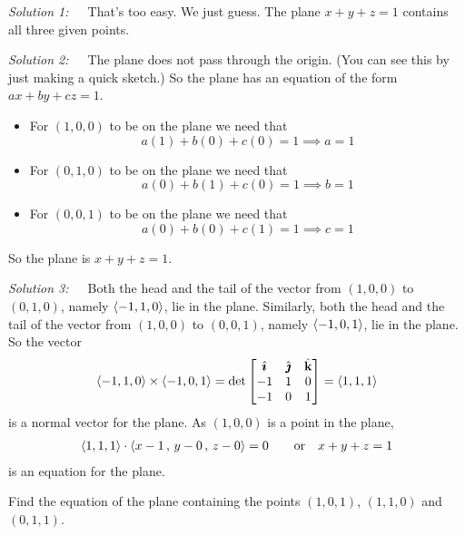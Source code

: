 \begin{solution}
\emph{Solution 1:}\ \ \ That's too easy. We just guess.
The plane $x+y+z=1$ contains all three given points.

\emph{Solution 2:}\ \ \ The plane does not pass through the origin.
(You can see this by just making a quick sketch.) So the plane has an equation
of the form $ax+by+cz=1$. 
\begin{itemize}
\item For $(1,0,0)$ to be on the plane we need that
\begin{equation*}
a(1) +b(0) +c(0) =1
\implies a=1
\end{equation*}
\item For $(0,1,0)$ to be on the plane we need that
\begin{equation*}
a(0) +b(1) +c(0) =1
\implies b=1
\end{equation*}
\item For $(0,0,1)$ to be on the plane we need that
\begin{equation*}
a(0) +b(0) +c(1) =1
\implies c=1
\end{equation*}
\end{itemize}
So the plane is $x+y+z=1$.

\emph{Solution 3:}\ \ \ 
Both the head and the tail of the vector from $(1,0,0)$ to $(0,1,0)$,
namely $\left< -1,1,0\right>$, lie in the plane. Similarly, 
both the head and the tail of the vector from $(1,0,0)$ to $(0,0,1)$,
namely $\left< -1,0,1\right>$, lie in the plane. So the vector
\begin{align*}
\left< -1,1,0\right> \times \left< -1,0,1\right>
=\det\left[\begin{matrix}
           \hat{\pmb{\imath}} & \hat{\pmb{\jmath}} & \hat{\mathbf{k}} \\
           -1  &  1  &  0 \\
           -1  &  0  &  1
  \end{matrix}\right]
=\left< 1 , 1 ,1  \right>
\end{align*}
is a normal vector for the plane. As $(1,0,0)$ is a point in the plane,
\begin{align*}
\left< 1 , 1 ,1 \right> \cdot \left< x-1\,,\,y-0\,,\, z-0 \right> = 0\qquad
\text{or}\quad
x+y+z=1
\end{align*}
is an equation for the plane.

\end{solution}


\begin{question}
Find the equation of the plane containing the points $(1,0,1)$,
$(1,1,0)$ and $(0,1,1)$.
\end{question}

